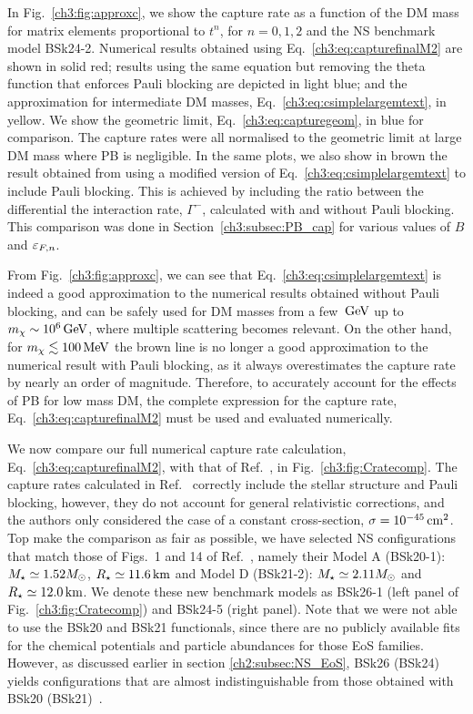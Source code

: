 In Fig.~\ref{ch3:fig:approxc}, we show the capture rate as a function of the DM mass for matrix elements proportional to $t^n$, for $n=0,1,2$ and the NS benchmark model BSk24-2. Numerical results obtained using Eq.~\ref{ch3:eq:capturefinalM2} are shown in solid red; results using the same equation but removing the theta function that enforces Pauli blocking are depicted in light blue; and the approximation for intermediate DM masses, Eq.~\ref{ch3:eq:csimplelargemtext}, in yellow. We show the geometric limit, Eq.~\ref{ch3:eq:capturegeom}, in blue for comparison. 
The capture rates were all normalised to the geometric limit at large DM mass where PB is negligible. 
In the same plots, we also show in brown the result obtained from using a modified version of Eq.~\ref{ch3:eq:csimplelargemtext} to include Pauli blocking.
This is achieved by including the ratio between the differential the interaction rate, $\Gamma^-$, calculated with and without Pauli blocking. This comparison was done in Section~\ref{ch3:subsec:PB_cap} for various values of $B$ and $\varepsilon_{F,n}$.

From Fig.~\ref{ch3:fig:approxc}, we can see that Eq.~\ref{ch3:eq:csimplelargemtext} is indeed a good approximation to the numerical results obtained without Pauli blocking, and can be safely used for DM masses from a few ${\rm \,GeV}$ up to $m_\chi\sim10^6{\rm \,GeV}$, where multiple scattering becomes relevant. 
On the other hand, for $m_\chi\lesssim 100{\rm \,MeV}$ the brown line is no longer a good approximation to the numerical result with Pauli blocking, as it always overestimates the capture rate by nearly an order of magnitude. Therefore, to accurately account for the effects of PB for low mass DM, the complete expression for the capture rate, Eq.~\ref{ch3:eq:capturefinalM2} must be used and evaluated numerically.

We now compare our full numerical capture rate calculation, Eq.~\ref{ch3:eq:capturefinalM2}, with that of Ref.~\cite{Garani:2018kkd_may_NewAnalysisNeutron}, in Fig.~\ref{ch3:fig:Cratecomp}. The capture rates calculated in Ref.~\cite{Garani:2018kkd_may_NewAnalysisNeutron} correctly include the stellar structure and Pauli blocking, however, they do not account for general relativistic corrections, and the authors only considered the case of a constant cross-section, $\sigma=10^{-45}{\rm \,cm}^2$. Top make the comparison as fair as possible, we have selected NS configurations that match those of Figs.~1 and 14 of Ref.~\cite{Garani:2018kkd_may_NewAnalysisNeutron}, namely their Model A (BSk20-1):  $M_\star\simeq1.52M_\odot$, $R_\star\simeq11.6{\rm \,km}$ and Model D (BSk21-2): $M_\star\simeq2.11M_\odot$ and $R_\star\simeq12.0{\rm \,km}$. We denote these new benchmark models as BSk26-1 (left panel of Fig.~\ref{ch3:fig:Cratecomp}) and BSk24-5 (right panel). Note that we were not able to use the BSk20 and BSk21 functionals, since there are no publicly available fits for the chemical potentials and particle abundances for those EoS families. However, as discussed earlier in section \ref{ch2:subsec:NS_EoS}, BSk26 (BSk24) yields configurations that are almost indistinguishable from those obtained with BSk20 (BSk21)~\cite{Perot:2019gwl_Rolesymmetryenergy}.

